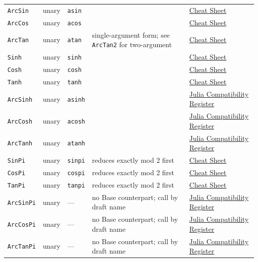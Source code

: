 \begin{table}[h]
\begin{tabulary}{\linewidth}{L L L L L}
\texttt{ArcSin} & unary & \texttt{asin} &  & \href{help\_\allowbreak{}cheat\_\allowbreak{}sheet.md}{Cheat Sheet} \\
\texttt{ArcCos} & unary & \texttt{acos} &  & \href{help\_\allowbreak{}cheat\_\allowbreak{}sheet.md}{Cheat Sheet} \\
\texttt{ArcTan} & unary & \texttt{atan} & single-argument form; see \texttt{ArcTan2} for two-argument & \href{help\_\allowbreak{}cheat\_\allowbreak{}sheet.md}{Cheat Sheet} \\
\texttt{Sinh} & unary & \texttt{sinh} &  & \href{help\_\allowbreak{}cheat\_\allowbreak{}sheet.md}{Cheat Sheet} \\
\texttt{Cosh} & unary & \texttt{cosh} &  & \href{help\_\allowbreak{}cheat\_\allowbreak{}sheet.md}{Cheat Sheet} \\
\texttt{Tanh} & unary & \texttt{tanh} &  & \href{help\_\allowbreak{}cheat\_\allowbreak{}sheet.md}{Cheat Sheet} \\
\texttt{ArcSinh} & unary & \texttt{asinh} &  & \href{reference\_\allowbreak{}julia\_\allowbreak{}compat.md}{Julia Compatibility Register} \\
\texttt{ArcCosh} & unary & \texttt{acosh} &  & \href{reference\_\allowbreak{}julia\_\allowbreak{}compat.md}{Julia Compatibility Register} \\
\texttt{ArcTanh} & unary & \texttt{atanh} &  & \href{reference\_\allowbreak{}julia\_\allowbreak{}compat.md}{Julia Compatibility Register} \\
\texttt{SinPi} & unary & \texttt{sinpi} & reduces exactly mod 2 first & \href{help\_\allowbreak{}cheat\_\allowbreak{}sheet.md}{Cheat Sheet} \\
\texttt{CosPi} & unary & \texttt{cospi} & reduces exactly mod 2 first & \href{help\_\allowbreak{}cheat\_\allowbreak{}sheet.md}{Cheat Sheet} \\
\texttt{TanPi} & unary & \texttt{tanpi} & reduces exactly mod 2 first & \href{help\_\allowbreak{}cheat\_\allowbreak{}sheet.md}{Cheat Sheet} \\
\texttt{ArcSinPi} & unary & — & no Base counterpart; call by draft name & \href{reference\_\allowbreak{}julia\_\allowbreak{}compat.md}{Julia Compatibility Register} \\
\texttt{ArcCosPi} & unary & — & no Base counterpart; call by draft name & \href{reference\_\allowbreak{}julia\_\allowbreak{}compat.md}{Julia Compatibility Register} \\
\texttt{ArcTanPi} & unary & — & no Base counterpart; call by draft name & \href{reference\_\allowbreak{}julia\_\allowbreak{}compat.md}{Julia Compatibility Register} \\
\bottomrule
\end{tabulary}

\end{table}



